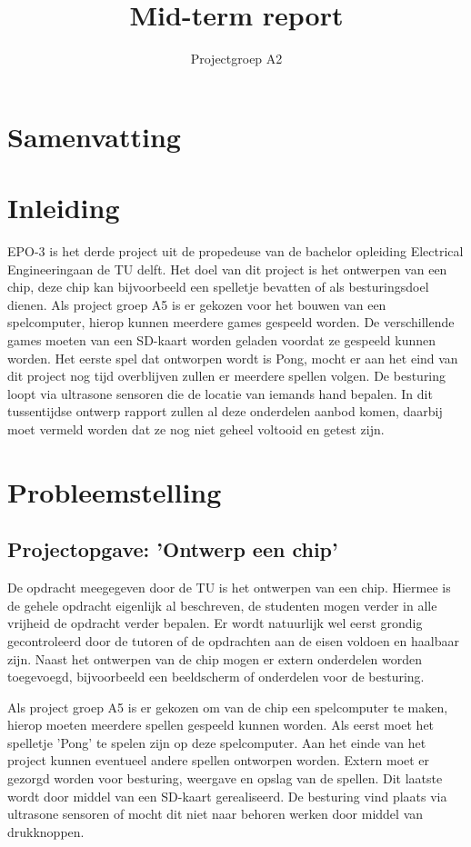 \documentclass[oneside,dutch]{tudelft-report}
\title{Mid-term report}
\author{Projectgroep A2}
\affiliation{TU Delft}
\begin{document}
\maketitle

\chapter{Samenvatting}

\tableofcontents
\mainmatter

\chapter{Inleiding}
EPO-3 is het derde project uit de propedeuse van de bachelor opleiding Electrical Engineeringaan de TU delft. Het doel van dit project is het ontwerpen van een chip, deze chip kan bijvoorbeeld een spelletje bevatten of als besturingsdoel dienen. Als project groep A5 is er gekozen voor het bouwen van een spelcomputer, hierop kunnen meerdere games gespeeld worden. De verschillende games moeten van een SD-kaart worden geladen voordat ze gespeeld kunnen worden. Het eerste spel dat ontworpen wordt is Pong, mocht er aan het eind van dit project nog tijd overblijven zullen er meerdere spellen volgen. De besturing loopt via ultrasone sensoren die de locatie van iemands hand bepalen. In dit tussentijdse ontwerp rapport zullen al deze onderdelen aanbod komen, daarbij moet vermeld worden dat ze nog niet geheel voltooid en getest zijn.  

\chapter{Probleemstelling}
\section{Projectopgave: 'Ontwerp een chip'}
De opdracht meegegeven door de TU is het ontwerpen van een chip. Hiermee is de gehele opdracht eigenlijk al beschreven, de studenten mogen verder in alle vrijheid de opdracht verder bepalen. Er wordt natuurlijk wel eerst grondig gecontroleerd door de tutoren of de opdrachten aan de eisen voldoen en haalbaar zijn.  Naast het ontwerpen van de chip mogen er extern onderdelen worden toegevoegd, bijvoorbeeld een beeldscherm of onderdelen voor de besturing. 

Als project groep A5 is er gekozen om van de chip een spelcomputer te maken, hierop moeten meerdere spellen gespeeld kunnen worden. Als eerst moet het spelletje 'Pong' te spelen zijn op deze spelcomputer. Aan het einde van het project kunnen eventueel andere spellen ontworpen worden. Extern moet er gezorgd worden voor besturing, weergave en opslag van de spellen. Dit laatste wordt door middel van een SD-kaart gerealiseerd. De besturing vind plaats via ultrasone sensoren of mocht dit niet naar behoren werken door middel van drukknoppen.
\end{document}
